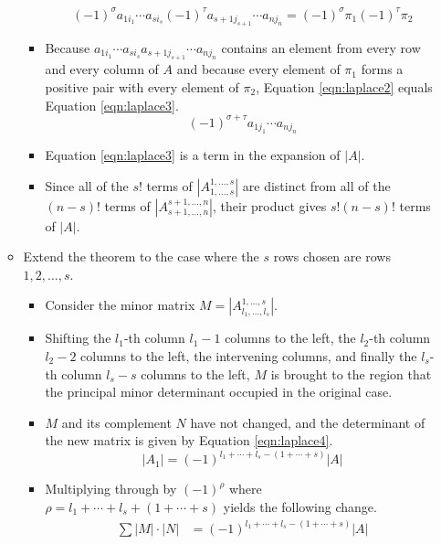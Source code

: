 \documentclass[titlepage]{article}
\newcounter{theorem}
\numberwithin{figure}{section}
\numberwithin{equation}{section}
\numberwithin{theorem}{section}
\begin{document}
\begin{itemize}
\begin{itemize}
\begin{itemize}
\begin{equation}
                (-1)^\sigma a_{1i_1}\cdots a_{si_s}(-1)^\tau a_{s+1j_{s+1}}\cdots a_{nj_n} = (-1)^\sigma\pi_1(-1)^\tau\pi_2
            \end{equation}
            \item Because $a_{1i_1}\cdots a_{si_s}a_{s+1j_{s+1}}\cdots a_{nj_n}$ contains an element from every row and every column of $A$ and because every element of $\pi_1$ forms a positive pair with every element of $\pi_2$, Equation \ref{eqn:laplace2} equals Equation \ref{eqn:laplace3}.
            \begin{equation}\label{eqn:laplace3}
                (-1)^{\sigma+\tau} a_{1j_1}\cdots a_{nj_n}
            \end{equation}
            \item Equation \ref{eqn:laplace3} is a term in the expansion of $|A|$.
            \item Since all of the $s!$ terms of $\left|A_{1,\dots,s}^{1,\dots,s}\right|$ are distinct from all of the $(n-s)!$ terms of $\left|A_{s+1,\dots,n}^{s+1,\dots,n}\right|$, their product gives $s!(n-s)!$ terms of $|A|$.
        \end{itemize}
        \item Extend the theorem to the case where the $s$ rows chosen are rows $1,2,\dots,s$.
        \begin{itemize}
            \item Consider the minor matrix $M=\left|A_{l_1,\dots,l_s}^{1,\dots,s}\right|$.
            \item Shifting the $l_1$-th column $l_1-1$ columns to the left, the $l_2$-th column $l_2-2$ columns to the left, the intervening columns, and finally the $l_s$-th column $l_s-s$ columns to the left, $M$ is brought to the region that the principal minor determinant occupied in the original case.
            \item $M$ and its complement $N$ have not changed, and the determinant of the new matrix is given by Equation \ref{eqn:laplace4}.
            \begin{equation}\label{eqn:laplace4}
                |A_1| = (-1)^{l_1+\cdots+l_s-(1+\cdots+s)}|A|
            \end{equation}
            \item Multiplying through by $(-1)^\rho$ where $\rho=l_1+\cdots+l_s+(1+\cdots+s)$ yields the following change.
            \begin{align*}
                \sum |M|\cdot|N| &= (-1)^{l_1+\cdots+l_s-(1+\cdots+s)}|A|\\

\end{align*}
\end{itemize}
\end{itemize}
\end{itemize}
\end{document}
